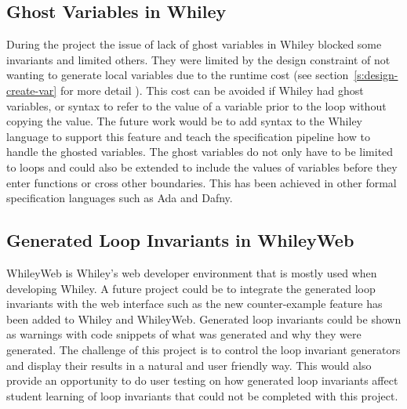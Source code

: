 \subsection{Ghost Variables in Whiley}

During the project the issue of lack of ghost variables in Whiley blocked some
invariants and limited others.
They were limited by the design constraint of not wanting to generate local
variables due to the runtime cost (see section~\ref{s:design-create-var} for
more detail ).
This cost can be avoided if Whiley had ghost variables, or syntax to refer to
the value of a variable prior to the loop without copying the value.
The future work would be to add syntax to the Whiley language to support this
feature and teach the specification pipeline how to handle the ghosted
variables.
The ghost variables do not only have to be limited to loops and could also be 
extended to include the values of variables before they enter functions or
cross other boundaries.
This has been achieved in other formal specification languages such as Ada and
Dafny.

\subsection{Generated Loop Invariants in WhileyWeb}

WhileyWeb is Whiley's web developer environment that is mostly used when
developing Whiley.
A future project could be to integrate the generated loop invariants with
the web interface such as the new counter-example feature has been added to
Whiley and WhileyWeb.
Generated loop invariants could be shown as warnings with code snippets of what
was generated and why they were generated.
The challenge of this project is to control the loop invariant
generators and display their results in a natural and user friendly way.
This would also provide an opportunity to do user testing on how generated
loop invariants affect student learning of loop invariants that could not be
completed with this project.
